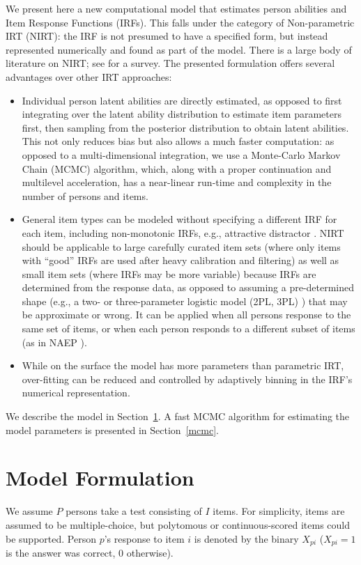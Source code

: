 \documentclass{article}
\begin{document}
We present here a new computational model that estimates person abilities and Item Response Functions (IRFs). This falls under the category of Non-parametric IRT (NIRT): the IRF is not presumed to have a specified form,
but instead represented numerically and found as part of the model. There is a large body of literature on
NIRT; see \cite{sijtsma} for a survey. The presented formulation offers several advantages over other IRT approaches:
\begin{itemize}
	\item Individual person latent abilities are directly estimated, as opposed to first integrating over
	the latent ability distribution to estimate item parameters first, then sampling from the posterior
	distribution to obtain latent abilities. This not only reduces bias but also allows a much faster
	computation: as opposed to a multi-dimensional integration, we use a Monte-Carlo Markov Chain (MCMC)
	algorithm, which, along with a proper continuation and multilevel acceleration, has a near-linear
	run-time and complexity in the number of persons and items.
	\item General item types can be modeled without specifying a different IRF for each item,
	including non-monotonic IRFs, e.g., attractive distractor  \cite{attractive_distractor}. NIRT should be applicable to
	large carefully curated item sets (where only items with ``good'' IRFs are used after heavy calibration
	and filtering) as well as small item sets (where IRFs may be more variable) because IRFs are determined
	from the response data, as opposed to assuming a pre-determined shape (e.g., a two- or three-parameter
	logistic model (2PL, 3PL) \cite{junker}) that may be approximate or wrong.
	It can be applied when all persons response to the same set of items, or when each person responds to
	a different subset of items (as in NAEP \cite{matt02}).
	\item While on the surface the model has more parameters than parametric IRT, over-fitting can be 
	reduced and controlled by adaptively binning in the IRF's numerical representation.
\end{itemize}
We describe the model in Section~\ref{model}. A fast MCMC algorithm for estimating the model parameters
is presented in Section~\ref{mcmc}.

\section{Model Formulation}
\label{model}
We assume $P$ persons take a test consisting of $I$ items. For simplicity, items are assumed to be multiple-choice, but polytomous or continuous-scored items could be supported. Person $p$'s response to item $i$ is denoted by the binary $X_{pi}$ ($X_{pi}=1$ is the answer was correct, $0$ otherwise).
\end{document}
